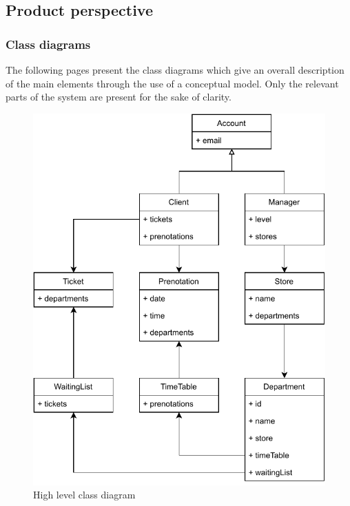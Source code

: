 \subsection{Product perspective}
\subsubsection{Class diagrams}
The following pages present the class diagrams which give an overall description of the main elements through the use of a conceptual model. Only the relevant parts of the system are present for the sake of clarity.
\begin{figure}[h]
\centering
\includegraphics{Images/main-class-diag.pdf}
\caption{\label{fig:metamodel}High level class diagram}
\end{figure}

\newpage
